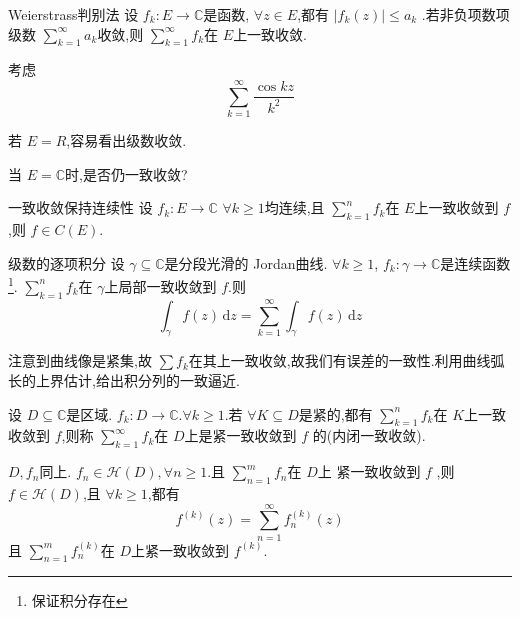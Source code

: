 \documentclass[../../复变函数.tex]{subfiles}
\begin{document}
\begin{theorem}{Weierstrass判别法}
    设 \(  f_{k}:E\to \mathbb{C}   \)是函数,  \(  \forall z \in E  \),都有 \(  \left| f_{k}\left( z \right)  \right|\le a_{k}   \)  .若非负项数项级数 \(  \sum _{k= 1}^{\infty}a_{k}  \)收敛,则 \(  \sum _{k= 1}^{\infty}f_{k}  \)在 \(  E  \)上一致收敛.   
\end{theorem}

\begin{example}
    考虑 \[
    \sum _{k= 1}^{\infty}\frac{\cos kz }{ k^{2}} 
    \]

    若 \(  E= R  \),容易看出级数收敛.
    
    当 \(  E= \mathbb{C}   \)时,是否仍一致收敛? 
\end{example}



\hspace*{\fill} 


\begin{theorem}{一致收敛保持连续性}
    设 \(  f_{k}:E\to \mathbb{C}   \) \(  \forall k\ge 1  \)均连续,且 \(  \sum _{k= 1}^{n}f_{k}  \)在 \(  E  \)上一致收敛到 \(  f  \),则 \(  f \in C\left( E \right)   \).      
\end{theorem}


\begin{theorem}{级数的逐项积分}
    设 \(   \gamma \subseteq \mathbb{C}   \)是分段光滑的 Jordan曲线.  \(  \forall k\ge 1  \), \(  f_{k}: \gamma \to \mathbb{C}   \)是连续函数\footnote{保证积分存在}.    \(  \sum _{k= 1}^{n}f_{k}  \)在 \(   \gamma   \)上局部一致收敛到 \(  f  \).则 \[
    \int _{ \gamma }f\left( z \right)\,\mathrm{d} z= \sum _{k= 1}^{\infty}\int_{ \gamma }f\left( z \right)\,\mathrm{d} z  
    \]   
\end{theorem}
\begin{note}
    注意到曲线像是紧集,故 \(  \sum f_{k}  \)在其上一致收敛,故我们有误差的一致性.利用曲线弧长的上界估计,给出积分列的一致逼近. 
\end{note}



\begin{definition}
    设 \(  D\subseteq \mathbb{C}   \)是区域. \(  f_{k} :D\to \mathbb{C}    \).\(  \forall k\ge 1  \).若 \(  \forall  K\subseteq D  \)是紧的,都有 \(  \sum _{k= 1}^{n}f_{k}  \)在 \(  K  \)上一致收敛到 \(  f  \),则称 \(  \sum _{k= 1}^{\infty}f_{k}  \)在 \(  D  \)上是紧一致收敛到 \(  f  \) 的(内闭一致收敛).  
\end{definition}


\begin{theorem}
    \(  D  ,f_{n}\)同上. \(  f_{n} \in \mathcal{H}\left( D \right),\forall n\ge 1   \).且 \(  \sum _{n= 1}^{m}f_{n}  \)在 \(  D  \)上 紧一致收敛到 \(  f  \)  ,则 \(  f \in \mathcal{H}\left( D \right)   \),且 \(  \forall k\ge 1  \),都有 \[
    f^{\left( k \right) }\left( z \right)= \sum _{n= 1}^{\infty}f_{n}^{\left( k \right) }\left( z \right)  
    \] 且 \(  \sum _{ n =  1 }^{m}f_{n}^{\left( k \right) }  \)在 \(  D  \)上紧一致收敛到 \(  f^{\left( k \right) }  \).   
\end{theorem}
\end{document}
